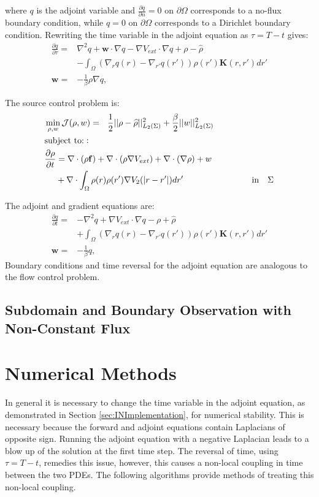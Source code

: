 \documentclass[11pt, a4paper]{article}
\theoremstyle{definition}
\newcommand{\Sta}{\rho}
\newcommand{\Adjb}{q}
\newcommand{\Con}{\mathbf{f}}
\begin{document}
where $\Adjb$ is the adjoint variable and $\frac{\partial \Adjb}{\partial n} = 0$ on $\partial \Omega$ corresponds to a no-flux boundary condition, while $\Adjb = 0$ on $\partial \Omega$ corresponds to a Dirichlet boundary condition.
Rewriting the time variable in the adjoint equation as $\tau = T-t$ gives:
\begin{align*}
\frac{\partial \Adjb}{\partial \tau} =& \nabla^2\Adjb +\mathbf{w} \cdot \nabla \Adjb - \nabla V_{ext} \cdot \nabla \Adjb + \Sta - \widehat \rho \\
&-\int_\Omega (\nabla_r \Adjb(r) - \nabla_{r'} \Adjb(r') ) \rho(r') \mathbf{K}(r,r') dr'\\
\mathbf{w} =& - \frac{1}{\beta} \Sta \nabla \Adjb,
\end{align*}

The source control problem is:
\begin{align}
\label{eqn:AdvDiffLinear}
&\min_{\Sta,{w} } \mathcal J(\Sta,{w}) = \ \ \frac{1}{2}||\Sta - \widehat \Sta||_{L_2(\Sigma)}^2  +\frac{\beta}{2}||{w}||_{L_2(\Sigma)}^2\\
& \text{subject to:}: \notag \\
&\frac{\partial \Sta}{\partial  t} = \nabla \cdot (\Sta\Con) + \nabla \cdot (\rho\nabla V_{ext}) + \nabla \cdot (\nabla \rho) + w \notag \\
& \quad \ +\nabla \cdot \int_\Omega \Sta(r)\Sta(r') \nabla V_2(|r-r'|)dr' \qquad \qquad \qquad \qquad \text{in} \quad \Sigma \notag
\end{align}

The adjoint and gradient equations are:
\begin{align*}
\frac{\partial \Adjb}{\partial t} =& - \nabla^2 \Adjb + \nabla V_{ext} \cdot \nabla \Adjb - \Sta + \widehat \rho \\
&+\int_\Omega (\nabla_r \Adjb(r) - \nabla_{r'} \Adjb(r') ) \rho(r') \mathbf{K}(r,r') dr'\\
\mathbf{w} =& - \frac{1}{\beta} \Adjb,
\end{align*}
Boundary conditions and time reversal for the adjoint equation are analogous to the flow control problem.

\subsection{Subdomain and Boundary Observation with Non-Constant Flux}


\section{Numerical Methods} \label{sec:NumericalMethods}
In general it is necessary to change the time variable in the adjoint equation, as demonstrated in Section \ref{sec:INImplementation}, for numerical stability. This is necessary because the forward and adjoint equations contain Laplacians of opposite sign. Running the adjoint equation with a negative Laplacian leads to a blow up of the solution at the first time step. The reversal of time, using $\tau = T-t$, remedies this issue, however, this causes a non-local coupling in time between the two PDEs.
The following algorithms provide methods of treating this non-local coupling.
\end{document}
